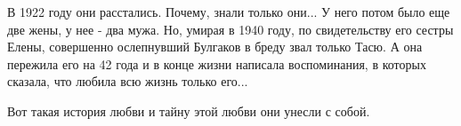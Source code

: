В 1922 году они расстались. Почему, знали только они... У него потом было еще
две жены, у нее - два мужа. Но, умирая в 1940 году, по свидетельству его сестры
Елены, совершенно ослепнувший Булгаков в бреду звал только Тасю. А она пережила
его на 42 года и в конце жизни написала воспоминания, в которых сказала, что
любила всю жизнь только его...

Вот такая история любви и тайну этой любви они унесли с собой.

